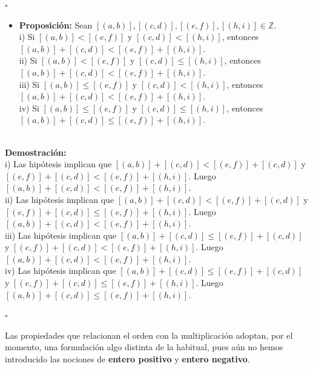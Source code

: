 \documentclass[10 pt]{article}
\begin{document}
\begin{flushright}
    $\square$
\end{flushright}

\begin{itemize}
    \item \Large{\textbf{Proposición:} Sean $[(a,b)],[(c,d)],[(e,f)],[(h,i)] \in \mathbb Z$. \\

    i) Si $[(a,b)]<[(e,f)]$ y $[(c,d)]<[(h,i)]$, entonces $[(a,b)]+[(c,d)]<[(e,f)]+[(h,i)]$. \\

    ii) Si $[(a,b)]<[(e,f)]$ y $[(c,d)] \leq [(h,i)]$, entonces $[(a,b)]+[(c,d)]<[(e,f)]+[(h,i)]$. \\

    iii) Si $[(a,b)] \leq [(e,f)]$ y $[(c,d)]<[(h,i)]$, entonces $[(a,b)]+[(c,d)]<[(e,f)]+[(h,i)]$. \\

    iv) Si $[(a,b)] \leq [(e,f)]$ y $[(c,d)] \leq [(h,i)]$, entonces $[(a,b)]+[(c,d)] \leq [(e,f)]+[(h,i)]$. \\ } \\
\end{itemize}

\Large{\textbf{Demostración:} \\

i) Las hipótesis implican que $[(a,b)]+[(c,d)]<[(e,f)]+[(c,d)]$ y $[(e,f)]+[(c,d)]<[(e,f)]+[(h,i)]$. Luego $[(a,b)]+[(c,d)]<[(e,f)]+[(h,i)]$. \\

ii) Las hipótesis implican que $[(a,b)]+[(c,d)]<[(e,f)]+[(c,d)]$ y $[(e,f)]+[(c,d)] \leq [(e,f)]+[(h,i)]$. Luego $[(a,b)]+[(c,d)]<[(e,f)]+[(h,i)]$. \\

iii) Las hipótesis implican que $[(a,b)]+[(c,d)]\leq [(e,f)]+[(c,d)]$ y $[(e,f)]+[(c,d)]<[(e,f)]+[(h,i)]$. Luego $[(a,b)]+[(c,d)]<[(e,f)]+[(h,i)]$. \\

iv) Las hipótesis implican que $[(a,b)]+[(c,d)] \leq [(e,f)]+[(c,d)]$ y $[(e,f)]+[(c,d)] \leq [(e,f)]+[(h,i)]$. Luego $[(a,b)]+[(c,d)] \leq [(e,f)]+[(h,i)]$.} \\

\begin{flushright}
    $\square$
\end{flushright}

\Large{Las propiedades que relacionan el orden con la multiplicación adoptan, por el momento, una formulación algo distinta de la habitual, pues aún no hemos introducido las nociones de \textbf{entero positivo} y \textbf{entero negativo}.} \\
\end{document}
